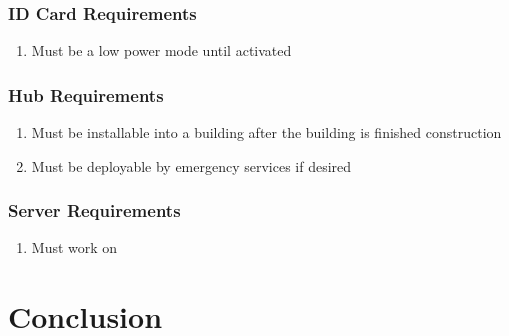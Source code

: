 \documentclass[12pt]{article}
\begin{document}
\subsubsection{ID Card Requirements}
	\begin{enumerate}
		\item Must be a low power mode until activated
	\end{enumerate}
\subsubsection{Hub Requirements}
	\begin{enumerate}
		\item Must be installable into a building after the building is finished construction
		\item Must be deployable by emergency services if desired
	\end{enumerate}
\subsubsection{Server Requirements}
	\begin{enumerate}
		\item Must work on
	\end{enumerate}

\section{Conclusion}
\end{document}

